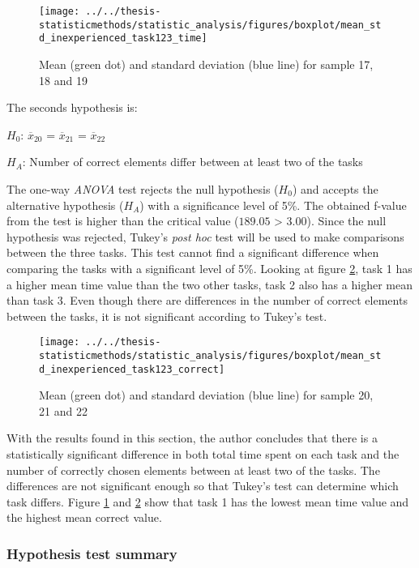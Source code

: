 \begin{figure}[H]
	\centering
	\texttt{[image: ../../thesis-statisticmethods/statistic\_analysis/figures/boxplot/mean\_std\_inexperienced\_task123\_time]}
	\caption{Mean (green dot) and standard deviation (blue line) for sample 17, 18 and 19}
	\label{fig:meanstdinexperiencedtask123time}
\end{figure}

The seconds hypothesis is:\\
\centerline{$H_{0}$: $\overline{x}_{20}$ = $\overline{x}_{21}$ = $\overline{x}_{22}$}
\centerline{$H_{A}$: Number of correct elements differ between at least two of the tasks}
\vspace{0.2cm}

The one-way \textit{ANOVA} test rejects the null hypothesis ($H_0$) and accepts the alternative hypothesis ($H_{A}$) with a significance level of 5\%. The obtained f-value from the test is higher than the critical value ($189.05$ > $3.00$). Since the null hypothesis was rejected, Tukey's \textit{post hoc} test will be used to make comparisons between the three tasks. This test cannot find a significant difference when comparing the tasks with a significant level of 5\%. Looking at figure \ref{fig:meanstdinexperiencedtask123correct}, task 1 has a higher mean time value than the two other tasks, task 2 also has a higher mean than task 3. Even though there are differences in the number of correct elements between the tasks, it is not significant according to Tukey's test. 

\begin{figure}[H]
	\centering
	\texttt{[image: ../../thesis-statisticmethods/statistic\_analysis/figures/boxplot/mean\_std\_inexperienced\_task123\_correct]}
	\caption{Mean (green dot) and standard deviation (blue line) for sample 20, 21 and 22}
	\label{fig:meanstdinexperiencedtask123correct}
\end{figure}

With the results found in this section, the author concludes that there is a statistically significant difference in both total time spent on each task and the number of correctly chosen elements between at least two of the tasks. The differences are not significant enough so that Tukey's test can determine which task differs. Figure \ref{fig:meanstdinexperiencedtask123time} and \ref{fig:meanstdinexperiencedtask123correct} show that task 1 has the lowest mean time value and the highest mean correct value. 

\subsubsection{Hypothesis test summary}

